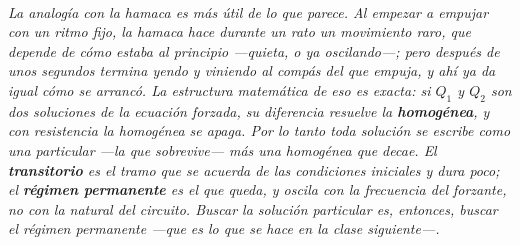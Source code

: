 \begin{center}
\begin{tikzpicture}[scale=1]
\end{tikzpicture}\\[0.5em]
{\small\itshape La analogía con la hamaca es más útil de lo que parece. Al
empezar a empujar con un ritmo fijo, la hamaca hace durante un rato un
movimiento raro, que depende de cómo estaba al principio ---quieta, o ya
oscilando---; pero después de unos segundos termina yendo y viniendo al
compás del que empuja, y ahí ya da igual cómo se arrancó. La estructura
matemática de eso es exacta: si $Q_1$ y $Q_2$ son dos soluciones de la ecuación
forzada, su diferencia resuelve la \textbf{homogénea}, y con resistencia la
homogénea se apaga. Por lo tanto toda solución se escribe como una particular
---la que sobrevive--- más una homogénea que decae. El \textbf{transitorio} es
el tramo que se acuerda de las condiciones iniciales y dura poco; el
\textbf{régimen permanente} es el que queda, y oscila con la frecuencia del
forzante, no con la natural del circuito. Buscar la solución particular es,
entonces, buscar el régimen permanente ---que es lo que se hace en la clase
siguiente---.}
\end{center}
